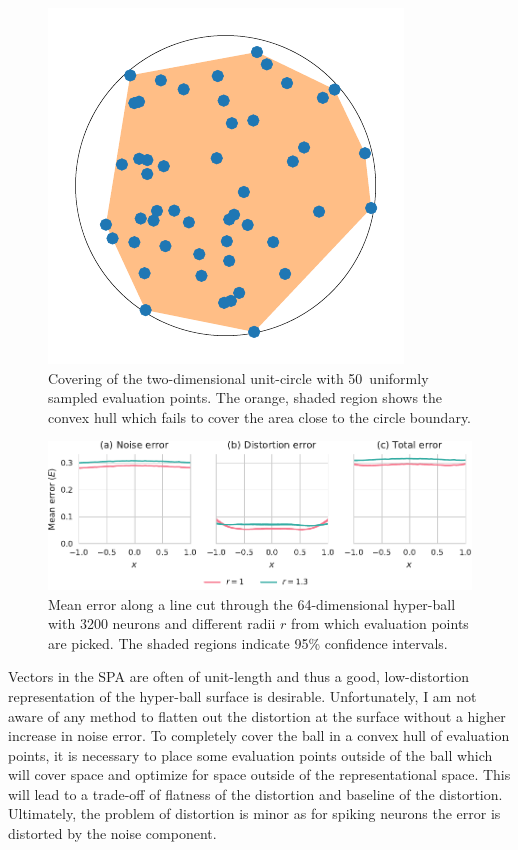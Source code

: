 \begin{figure}
    \centering
    \includegraphics{figures/circle-covering}
    \caption{Covering of the two-dimensional unit-circle with 50~uniformly sampled evaluation points. The orange, shaded region shows the convex hull which fails to cover the area close to the circle boundary.}\label{fig:circle-covering}
\end{figure}
\begin{figure}
    \centering
    \includegraphics{figures/error-radius-scale}
    \caption{Mean error along a line cut through the \num{64}-dimensional hyper-ball with \num{3200} neurons and different radii $r$ from which evaluation points are picked. The shaded regions indicate 95\% confidence intervals.}\label{fig:error-radius-scale}
\end{figure}

Vectors in the SPA are often of unit-length and thus a good, low-distortion representation of the hyper-ball surface is desirable.
Unfortunately, I am not aware of any method to flatten out the distortion at the surface without a higher increase in noise error.
To completely cover the ball in a convex hull of evaluation points, it is necessary to place some evaluation points outside of the ball which will cover space and optimize for space outside of the representational space.
This will lead to a trade-off of flatness of the distortion and baseline of the distortion.
Ultimately, the problem of distortion is minor as for spiking neurons the error is distorted by the noise component.


